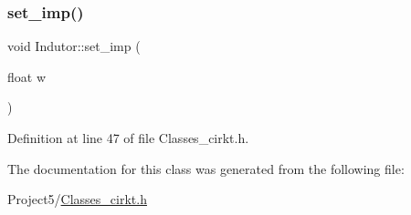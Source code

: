 \subsubsection{\texorpdfstring{set\+\_\+imp()}{set\_imp()}}
{\footnotesize\ttfamily void Indutor\+::set\+\_\+imp (\begin{DoxyParamCaption}\item[{float}]{w }\end{DoxyParamCaption})}



Definition at line 47 of file Classes\+\_\+cirkt.\+h.



The documentation for this class was generated from the following file\+:\begin{DoxyCompactItemize}
\item 
Project5/\mbox{\hyperlink{_classes__cirkt_8h}{Classes\+\_\+cirkt.\+h}}\end{DoxyCompactItemize}
